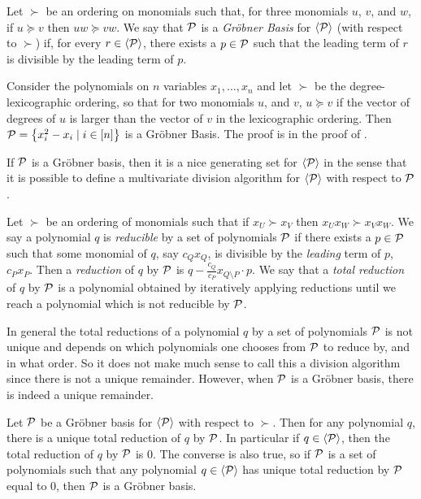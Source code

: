 \begin{definition}\label{def:grobner}
    Let $\succ$ be an ordering on monomials such that, for three monomials $u$, $v$, and $w$, if $u \succeq v$ then $uw \succeq vw$. We say that $\mathcal P$ is a \emph{Gr\"obner Basis} for $\langle \mathcal P \rangle$ (with respect to $\succ$) if, for every $r \in \langle \mathcal P \rangle$, there exists a $p \in \mathcal P$ such that the leading term of $r$ is divisible by the leading term of $p$.
\end{definition}
\begin{example}\label{ex:grobner}
Consider the polynomials on $n$ variables $x_1,\dots,x_n$ and let $\succ$ be the degree-lexicographic ordering, so that for two monomials $u$, and $v$, $u \succeq v$ if the vector of degrees of $u$ is larger than the vector of $v$ in the lexicographic ordering. Then $\mathcal P = \left\{x_i^2 - x_i \mid i \in [n]\right\}$ is a Gr\"obner Basis. The proof is in the proof of .
\end{example}
If $\mathcal P$ is a Gr\"obner basis, then it is a nice generating set for $\langle \mathcal P \rangle$ in the sense that it is possible to define a multivariate division algorithm for $\langle \mathcal P \rangle$ with respect to $\mathcal P$.
\begin{definition}
Let $\succ$ be an ordering of monomials such that if $x_U \succ x_V$ then $x_Ux_W \succ x_Vx_W$. We say a polynomial $q$ is \emph{reducible} by a set of polynomials $\mathcal P$ if there exists a $p \in \mathcal P$ such that some monomial of $q$, say $c_Qx_Q$, is divisible by the \emph{leading} term of $p$, $c_Px_P$. Then a \emph{reduction} of $q$ by $\mathcal P$ is $q - \frac{c_Q}{c_P}x_{Q \setminus P} \cdot p$. We say that a \emph{total reduction} of $q$ by $\mathcal P$ is a polynomial obtained by iteratively applying reductions until we reach a polynomial which is not reducible by $\mathcal P$.
\end{definition}
In general the total reductions of a polynomial $q$ by a set of polynomials $\mathcal P$ is not unique and depends on which polynomials one chooses from $\mathcal P$ to reduce by, and in what order. So it does not make much sense to call this a division algorithm since there is not a unique remainder. However, when $\mathcal P$ is a Gr\"obner basis, there is indeed a unique remainder.
\begin{proposition}\label{prop:grobner-unique}
Let $\mathcal P$ be a Gr\"obner basis for $\langle \mathcal P \rangle$ with respect to $\succ$. Then for any polynomial $q$, there is a unique total reduction of $q$ by $\mathcal P$. In particular if $q \in \langle \mathcal P \rangle$, then the total reduction of $q$ by $\mathcal P$ is $0$. The converse is also true, so if $\mathcal P$ is a set of polynomials such that any polynomial $q \in \langle \mathcal P \rangle$ has unique total reduction by $\mathcal P$ equal to $0$, then $\mathcal P$ is a Gr\"obner basis.
\end{proposition}
